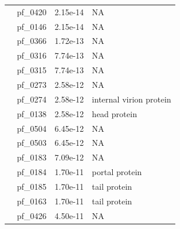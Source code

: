 \begin{table}
\begin{lrbox}{\rightbox}
\begin{tabular}[t]{llll}
                                        & pf\_0420 & 2.15e-14 & NA \\ 
                                        & pf\_0146 & 2.15e-14 & NA \\ 
                                        & pf\_0366 & 1.72e-13 & NA \\ 
                                        & pf\_0316 & 7.74e-13 & NA \\ 
                                        & pf\_0315 & 7.74e-13 & NA \\ 
                                        & pf\_0273 & 2.58e-12 & NA \\ 
                                        & pf\_0274 & 2.58e-12 & internal virion protein \\ 
                                        & pf\_0138 & 2.58e-12 & head protein \\ 
                                        & pf\_0504 & 6.45e-12 & NA \\ 
                                        & pf\_0503 & 6.45e-12 & NA \\ 
                                        & pf\_0183 & 7.09e-12 & NA \\ 
                                        & pf\_0184 & 1.70e-11 & portal protein \\ 
                                        & pf\_0185 & 1.70e-11 & tail protein \\ 
                                        & pf\_0163 & 1.70e-11 & tail protein \\ 
                                        & pf\_0426 & 4.50e-11 & NA \\ 
            \bottomrule
            \end{tabular}
    \end{lrbox}


    \centering
    \scalebox{.9}{
    \makebox[0pt]{%
        \hspace*{\fill}
        \begin{minipage}[t]{\wd\leftbox}
        \usebox{\leftbox}
        \end{minipage}\hfill
        \begin{minipage}[t]{\wd\rightbox}
        \usebox{\rightbox}
        \end{minipage}
        \hspace*{\fill}
        }
    }

    \label{phage:table:cluster_functions}
\end{table}

